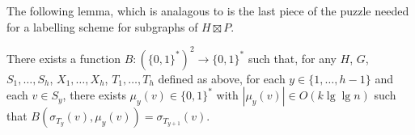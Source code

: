 \documentclass[kpfonts]{patmorin}
\begin{document}
% 
% 
% 
% 

The following lemma, which is analagous to  is the last piece of the puzzle needed for a labelling scheme for subgraphs of $H\boxtimes P$.

\begin{lem}
  There exists a function $B:(\{0,1\}^*)^2\to \{0,1\}^*$ such that, for any 
  $H$, $G$, $S_1,\ldots,S_h$, $X_1,\ldots,X_h$, $T_1,\ldots,T_h$ defined as above, for each $y\in\{1,\ldots,h-1\}$ and each $v\in S_y$, there exists $\mu_y(v)\in\{0,1\}^*$ with $|\mu_y(v)|\in O(k\lg\lg n)$ such that $B(\sigma_{T_y}(v), \mu_y(v))=\sigma_{T_{y+1}}(v)$.
\end{lem}
\end{document}

